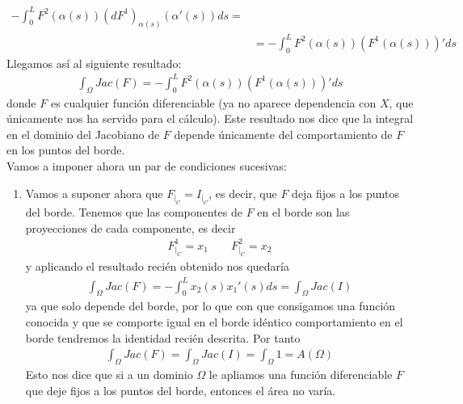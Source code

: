 \begin{observacion}
\begin{enumerate}[start=4]
\begin{align*}
            - \int_0^L F^2(\alpha(s))(dF^1)_{\alpha(s)}(\alpha'(s)) ds =\\
            &=
            -\int_0^L F^2(\alpha(s))(F^1(\alpha(s)))' ds
        \end{align*}
        Llegamos así al siguiente resultado:
        \begin{gather*}
            \boxed{\int_\Omega Jac(F) = -\int_0^L F^2(\alpha(s))(F^1(\alpha(s)))' ds}
        \end{gather*}
        donde $F$ es cualquier función diferenciable (ya no aparece dependencia con $X$, que únicamente nos ha servido para el cálculo). Este resultado nos dice que la integral en el dominio del Jacobiano de $F$ depende únicamente del comportamiento de $F$ en los puntos del borde. \\

        Vamos a imponer ahora un par de condiciones sucesivas:
        \begin{enumerate}
            \item Vamos a suponer ahora que $F_{|_C}=I_{|_C}$, es decir, que $F$ deja fijos a los puntos del borde. Tenemos que las componentes de $F$ en el borde son las proyecciones de cada componente, es decir
            \begin{gather*}
                F^1_{|_C} = x_1 \qquad F^2_{|_C} = x_2
            \end{gather*}
            y aplicando el resultado recién obtenido nos quedaría
            \begin{gather*}
                \int_\Omega Jac(F) = - \int_0^L x_2(s)x_1'(s) ds = \int_\Omega Jac(I)
            \end{gather*}
            ya que solo depende del borde, por lo que con que consigamos una función conocida y que se comporte igual en el borde idéntico comportamiento en el borde tendremos la identidad recién descrita. Por tanto
            \begin{gather*}
                \int_\Omega Jac(F) = \int_\Omega Jac(I) = \int_\Omega 1 = A(\Omega)
            \end{gather*}
            Esto nos dice que si a un dominio $\Omega$ le apliamos una función diferenciable $F$ que deje fijos a los puntos del borde, entonces el área no varía.


\end{enumerate}
\end{enumerate}
\end{observacion}
